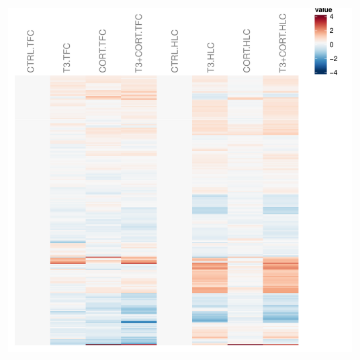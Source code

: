 \begin{figure}[!htbp]
\centering
\vspace{1\baselineskip}
%
%
\begin{subfigure}{0.49\textwidth}
	\includegraphics[width=\textwidth]
	{Figures/comparison-tfc-hlc-aging/comparison-tfc-hlc-aging-all.pdf}
	\caption{}
	\label{subfig:comparison-tfc-hlc-aging-all}
\end{subfigure}
\begin{subfigure}{0.49\textwidth}

\end{subfigure}
\end{figure}
